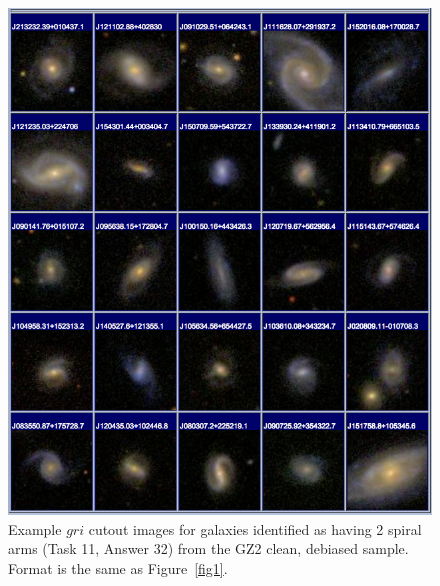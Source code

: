 \documentclass[useAMS,usenatbib]{mn2e}
\begin{document}
\newpage
\clearpage
\begin{figure}
\includegraphics[angle=0,width=7.0in]{figures/gallery/spiral2.png}
\caption{Example $gri$ cutout images for galaxies identified as having 2 spiral arms (Task 11, Answer 32) from the GZ2 clean, debiased sample. Format is the same as Figure~\ref{fig1}.}
\end{figure}
\end{document}
